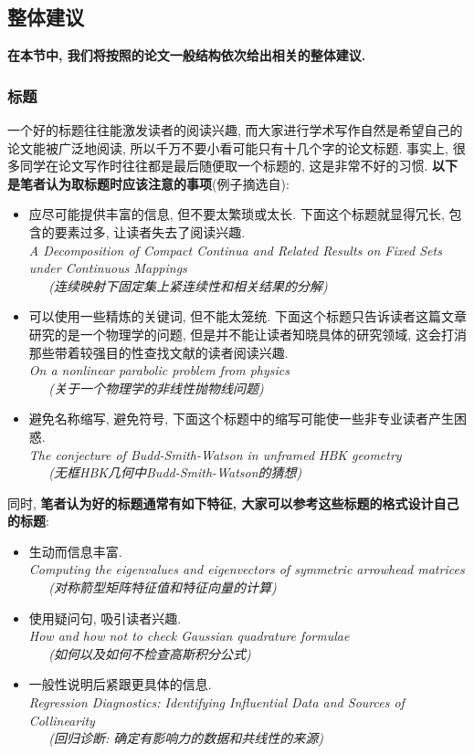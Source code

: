 \documentclass{booki}
\begin{document}
\subsection{整体建议}
{\textbf{在本节中, 我们将按照的论文一般结构依次给出相关的整体建议.}}
\subsubsection{标题}
一个好的标题往往能激发读者的阅读兴趣, 而大家进行学术写作自然是希望自己的论文能被广泛地阅读, 所以千万不要小看可能只有十几个字的论文标题. 事实上, 很多同学在论文写作时往往都是最后随便取一个标题的, 这是非常不好的习惯. \textbf{以下是笔者认为取标题时应该注意的事项}(例子摘选自\cite{JungelHow}):
\begin{itemize}
    \item 应尽可能提供丰富的信息, 但不要太繁琐或太长. 下面这个标题就显得冗长, 包含的要素过多, 让读者失去了阅读兴趣{.}\\
          \textit{A Decomposition of Compact Continua and Related Results on Fixed Sets under Continuous Mappings \\ \ \ \  (连续映射下固定集上紧连续性和相关结果的分解)}
    \item 可以使用一些精炼的关键词, 但不能太笼统. 下面这个标题只告诉读者这篇文章研究的是一个物理学的问题, 但是并不能让读者知晓具体的研究领域, 这会打消那些带着较强目的性查找文献的读者阅读兴趣{.}\\
          \textit{On a nonlinear parabolic problem from physics \\ \ \ \  (关于一个物理学的非线性抛物线问题)}
    \item 避免名称缩写, 避免符号, 下面这个标题中的缩写可能使一些非专业读者产生困惑{.}\\
          \textit{The conjecture of Budd-Smith-Watson in unframed HBK geometry  \\ \ \ \ (无框HBK几何中Budd-Smith-Watson的猜想)}
\end{itemize}
\par
同时, \textbf{笔者认为好的标题通常有如下特征, 大家可以参考这些标题的格式设计自己的标题}:
\begin{itemize}
    \item 生动而信息丰富{.}\\
          \textit{Computing the eigenvalues and eigenvectors of symmetric arrowhead matrices \\ \ \ \ (对称箭型矩阵特征值和特征向量的计算)}
    \item 使用疑问句, 吸引读者兴趣{.}\\
          \textit{How and how not to check Gaussian quadrature formulae \\ \ \ \ (如何以及如何不检查高斯积分公式)}
    \item 一般性说明后紧跟更具体的信息{.}\\
          \textit{Regression Diagnostics: Identifying Influential Data and Sources of Collinearity \\  \ \ \
              (回归诊断: 确定有影响力的数据和共线性的来源)}
\end{itemize}
\end{document}
